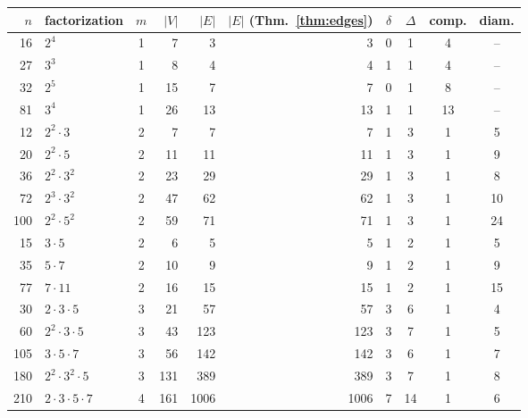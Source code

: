 \begin{tabular}{rlcrrrcccc}
\toprule
$n$ & factorization & $m$ & $|V|$ & $|E|$ & $|E|$ (Thm.~\ref{thm:edges}) & $\delta$ & $\Delta$ & comp. & diam. \\
\midrule
16 & $2^{4}$ & 1 & 7 & 3 & 3 & 0 & 1 & 4 & -- \\
27 & $3^{3}$ & 1 & 8 & 4 & 4 & 1 & 1 & 4 & -- \\
32 & $2^{5}$ & 1 & 15 & 7 & 7 & 0 & 1 & 8 & -- \\
81 & $3^{4}$ & 1 & 26 & 13 & 13 & 1 & 1 & 13 & -- \\
12 & $2^{2} \cdot 3$ & 2 & 7 & 7 & 7 & 1 & 3 & 1 & 5 \\
20 & $2^{2} \cdot 5$ & 2 & 11 & 11 & 11 & 1 & 3 & 1 & 9 \\
36 & $2^{2} \cdot 3^{2}$ & 2 & 23 & 29 & 29 & 1 & 3 & 1 & 8 \\
72 & $2^{3} \cdot 3^{2}$ & 2 & 47 & 62 & 62 & 1 & 3 & 1 & 10 \\
100 & $2^{2} \cdot 5^{2}$ & 2 & 59 & 71 & 71 & 1 & 3 & 1 & 24 \\
15 & $3 \cdot 5$ & 2 & 6 & 5 & 5 & 1 & 2 & 1 & 5 \\
35 & $5 \cdot 7$ & 2 & 10 & 9 & 9 & 1 & 2 & 1 & 9 \\
77 & $7 \cdot 11$ & 2 & 16 & 15 & 15 & 1 & 2 & 1 & 15 \\
30 & $2 \cdot 3 \cdot 5$ & 3 & 21 & 57 & 57 & 3 & 6 & 1 & 4 \\
60 & $2^{2} \cdot 3 \cdot 5$ & 3 & 43 & 123 & 123 & 3 & 7 & 1 & 5 \\
105 & $3 \cdot 5 \cdot 7$ & 3 & 56 & 142 & 142 & 3 & 6 & 1 & 7 \\
180 & $2^{2} \cdot 3^{2} \cdot 5$ & 3 & 131 & 389 & 389 & 3 & 7 & 1 & 8 \\
210 & $2 \cdot 3 \cdot 5 \cdot 7$ & 4 & 161 & 1006 & 1006 & 7 & 14 & 1 & 6 \\
\bottomrule
\end{tabular}
